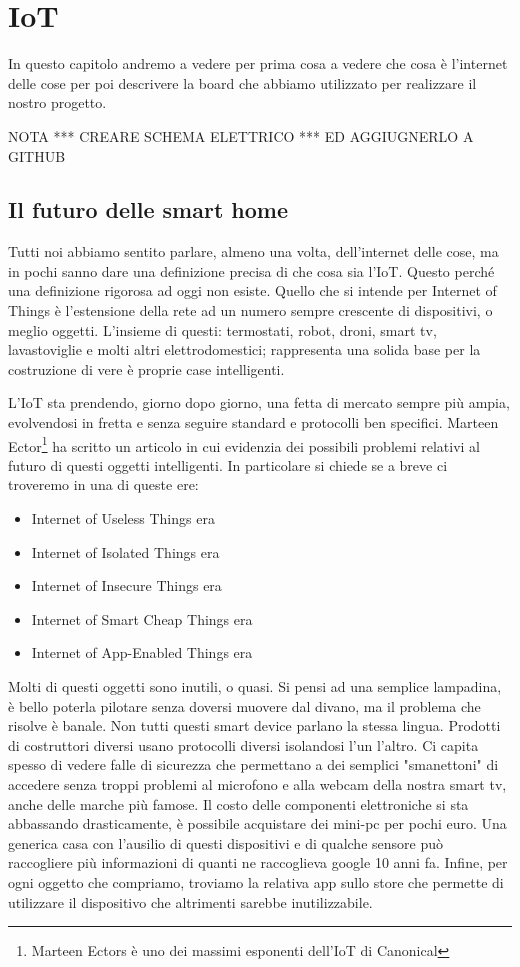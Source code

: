 \chapter{IoT}
In questo capitolo andremo a vedere per prima cosa a vedere che cosa è l'internet delle cose per poi descrivere la board che abbiamo utilizzato per realizzare il nostro progetto. 

{\Huge NOTA *** CREARE SCHEMA ELETTRICO *** ED AGGIUGNERLO A GITHUB}


\section{Il futuro delle smart home}
Tutti noi abbiamo sentito parlare, almeno una volta, dell'internet delle cose,
ma in pochi sanno dare una definizione precisa di che cosa sia l'IoT.
Questo perché una definizione rigorosa ad oggi non esiste.
Quello che si intende per Internet of Things è l'estensione della rete ad un numero sempre crescente di dispositivi, o meglio oggetti.
L'insieme di questi: termostati, robot, droni, smart tv, lavastoviglie e molti altri elettrodomestici; rappresenta una solida base per la costruzione di vere è proprie case intelligenti.

L'IoT sta prendendo, giorno dopo giorno, una fetta di mercato sempre più ampia, evolvendosi in fretta e senza seguire standard e protocolli ben specifici. 
Marteen Ector\footnote{Marteen Ectors è uno dei massimi esponenti dell'IoT di  Canonical} ha scritto un articolo\cite{smart} in cui evidenzia dei possibili problemi relativi al futuro di questi oggetti intelligenti.
In particolare si chiede se a breve ci troveremo in una di queste ere:
\begin{itemize}
\item Internet of Useless Things era
\item Internet of Isolated Things era
\item Internet of Insecure Things era
\item Internet of Smart Cheap Things era
\item Internet of App-Enabled Things era
\end{itemize}
Molti di questi oggetti sono inutili, o quasi. Si pensi ad una semplice lampadina, è bello poterla pilotare senza doversi muovere dal divano, ma il problema che risolve è banale.
Non tutti questi smart device parlano la stessa lingua. Prodotti di costruttori diversi usano protocolli diversi isolandosi l'un l'altro.
Ci capita spesso di vedere falle di sicurezza che permettano a dei semplici "smanettoni" di accedere senza troppi problemi al microfono e alla webcam della nostra smart tv, anche delle marche più famose.
Il costo delle componenti elettroniche si sta abbassando drasticamente, è possibile acquistare dei mini-pc per pochi euro. Una generica casa con l'ausilio di questi dispositivi e di qualche sensore può raccogliere più informazioni di quanti ne raccoglieva google 10 anni fa.
Infine, per ogni oggetto che compriamo, troviamo la relativa app sullo store che permette di utilizzare il dispositivo che altrimenti sarebbe inutilizzabile.

